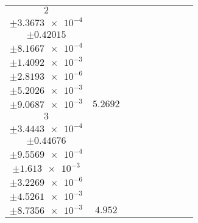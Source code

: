 \documentclass[8pt]{article}
\begin{document}
\begin{longtable}[l]{c c c c c c c c c}
$\num{2}$ & \begin{tabular}[c]{@{}c@{}}$\num{6.1868e-2}$ \\ $\pm\num{3.3673e-4}$\end{tabular} & \begin{tabular}[c]{@{}c@{}}$\num{0.14623}$ \\ $\pm\num{0.42015}$\end{tabular} & \begin{tabular}[c]{@{}c@{}}$\num{-2.437}$ \\ $\pm\num{8.1667e-4}$\end{tabular} & \begin{tabular}[c]{@{}c@{}}$\num{942.12}$ \\ $\pm\num{1.4092e-3}$\end{tabular} & \begin{tabular}[c]{@{}c@{}}$\num{1.8848}$ \\ $\pm\num{2.8193e-6}$\end{tabular} & \begin{tabular}[c]{@{}c@{}}$\num{1.181}$ \\ $\pm\num{5.2026e-3}$\end{tabular} & \begin{tabular}[c]{@{}c@{}}$\num{4.19}$ \\ $\pm\num{9.0687e-3}$\end{tabular} & $\num{5.2692}$\\
$\num{3}$ & \begin{tabular}[c]{@{}c@{}}$\num{5.6121e-2}$ \\ $\pm\num{3.4443e-4}$\end{tabular} & \begin{tabular}[c]{@{}c@{}}$\num{5.0046e-2}$ \\ $\pm\num{0.44676}$\end{tabular} & \begin{tabular}[c]{@{}c@{}}$\num{-2.1376}$ \\ $\pm\num{9.5569e-4}$\end{tabular} & \begin{tabular}[c]{@{}c@{}}$\num{942.5}$ \\ $\pm\num{1.613e-3}$\end{tabular} & \begin{tabular}[c]{@{}c@{}}$\num{1.8855}$ \\ $\pm\num{3.2269e-6}$\end{tabular} & \begin{tabular}[c]{@{}c@{}}$\num{1.1129}$ \\ $\pm\num{4.5261e-3}$\end{tabular} & \begin{tabular}[c]{@{}c@{}}$\num{4.1348}$ \\ $\pm\num{8.7356e-3}$\end{tabular} & $\num{4.952}$\\

\end{longtable}
\end{document}
